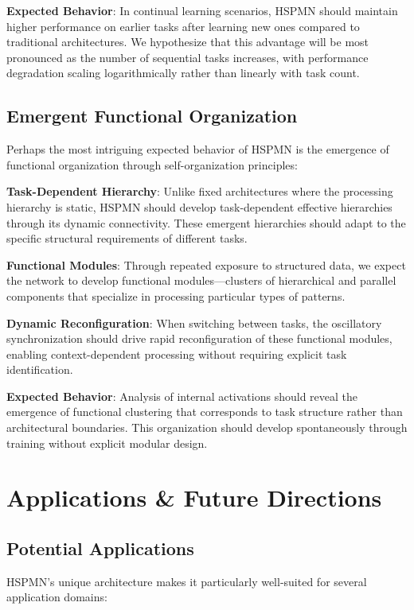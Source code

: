 \documentclass[11pt,a4paper,twocolumn]{article}
\begin{document}
\textbf{Expected Behavior}: In continual learning scenarios, HSPMN should maintain higher performance on earlier tasks after learning new ones compared to traditional architectures. We hypothesize that this advantage will be most pronounced as the number of sequential tasks increases, with performance degradation scaling logarithmically rather than linearly with task count.

\subsection{Emergent Functional Organization}

Perhaps the most intriguing expected behavior of HSPMN is the emergence of functional organization through self-organization principles:

\textbf{Task-Dependent Hierarchy}: Unlike fixed architectures where the processing hierarchy is static, HSPMN should develop task-dependent effective hierarchies through its dynamic connectivity. These emergent hierarchies should adapt to the specific structural requirements of different tasks.

\textbf{Functional Modules}: Through repeated exposure to structured data, we expect the network to develop functional modules—clusters of hierarchical and parallel components that specialize in processing particular types of patterns.

\textbf{Dynamic Reconfiguration}: When switching between tasks, the oscillatory synchronization should drive rapid reconfiguration of these functional modules, enabling context-dependent processing without requiring explicit task identification.

\textbf{Expected Behavior}: Analysis of internal activations should reveal the emergence of functional clustering that corresponds to task structure rather than architectural boundaries. This organization should develop spontaneously through training without explicit modular design.

\section{Applications \& Future Directions}

\subsection{Potential Applications}

HSPMN's unique architecture makes it particularly well-suited for several application domains:
\end{document}
